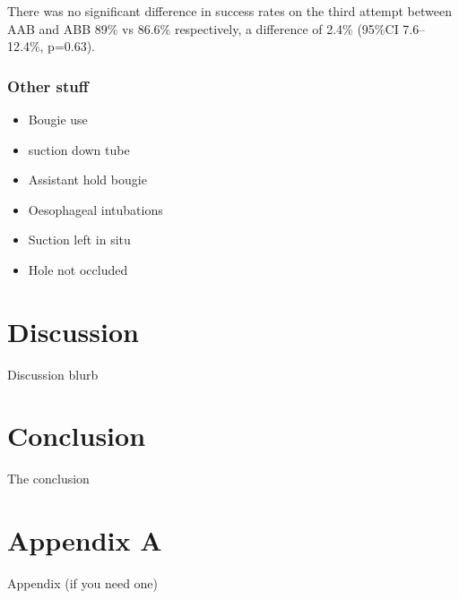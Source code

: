\documentclass[]{article}
\providecommand{\tightlist}{%
  \setlength{\itemsep}{0pt}\setlength{\parskip}{0pt}}
\begin{document}
There was no significant difference in success rates on the third
attempt between AAB and ABB 89\% vs 86.6\% respectively, a difference of
2.4\% (95\%CI 7.6--12.4\%, p=0.63).

\hypertarget{other-stuff}{%
\subsubsection{Other stuff}\label{other-stuff}}

\begin{itemize}
\tightlist
\item
  Bougie use
\item
  suction down tube
\item
  Assistant hold bougie
\item
  Oesophageal intubations
\item
  Suction left in situ
\item
  Hole not occluded
\end{itemize}

\hypertarget{discussion}{%
\section{Discussion}\label{discussion}}

Discussion blurb

\hypertarget{conclusion-1}{%
\section{Conclusion}\label{conclusion-1}}

The conclusion

\hypertarget{appendix-a}{%
\section{Appendix A}\label{appendix-a}}

Appendix (if you need one)


\end{document}
